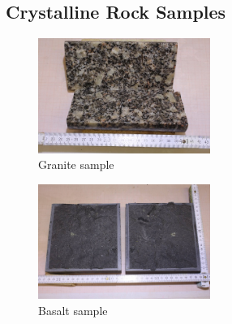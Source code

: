 \subsection{Crystalline Rock Samples}

\begin{figure}[!ht]
\begin{center}
\includegraphics[width=0.5\textwidth]{./figures/ExpRockGranite.JPG}
\end{center}
\caption{Granite sample}
\label{fig:RockGranite}
\end{figure}

\begin{figure}[!ht]
\begin{center}
\includegraphics[width=0.5\textwidth]{./figures/ExpRockBasalt.jpg}
\end{center}
\caption{Basalt sample}
\label{fig:RockBasalt}
\end{figure}

